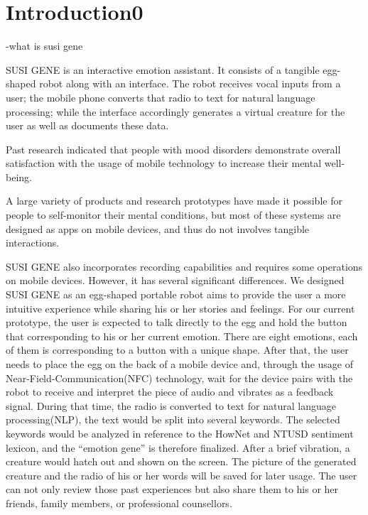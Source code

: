 \documentclass[manuscript,screen]{acmart}
\begin{document}
\maketitle

\section{Introduction0}

-what is susi gene

SUSI GENE is an interactive emotion assistant.  It consists of a tangible egg-shaped robot along with an interface. The robot receives vocal inputs from a user; the mobile phone converts that radio to text for natural language processing; while the interface accordingly generates a virtual creature for the user as well as documents these data.

Past research indicated that people with mood disorders demonstrate overall satisfaction with the usage of mobile technology to increase their mental well-being.\cite{proudfoot2010community}

A large variety of products and research prototypes have made it possible for people to self-monitor their mental conditions, but most of these systems are designed as apps on mobile devices, and thus do not involves tangible interactions.

SUSI GENE also incorporates recording capabilities and requires some operations on mobile devices. However, it has several significant differences. We designed SUSI GENE as an egg-shaped portable robot aims to provide the user a more intuitive experience while sharing his or her stories and feelings. For our current prototype, the user is expected to talk directly to the egg and hold the button that corresponding to his or her current emotion. There are eight emotions, each of them is corresponding to a button with a unique shape. After that, the user needs to place the egg on the back of a mobile device and, through the usage of Near-Field-Communication(NFC) technology, wait for the device pairs with the robot to receive and interpret the piece of audio and vibrates as a feedback signal. During that time, the radio is converted to text for natural language processing(NLP), the text would be split into several keywords. The selected keywords would be analyzed in reference to the HowNet and NTUSD sentiment lexicon, and the “emotion gene” is therefore finalized. After a brief vibration, a creature would hatch out and shown on the screen. The picture of the generated creature and the radio of his or her words will be saved for later usage. The user can not only review those past experiences but also share them to his or her friends, family members, or professional counsellors.
\end{document}
